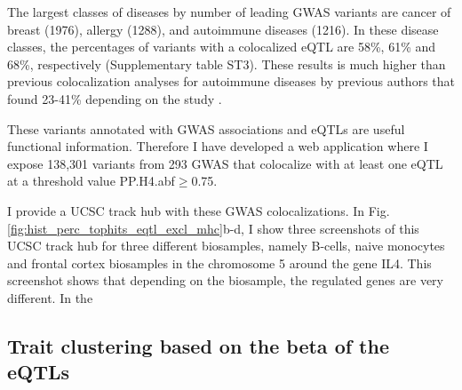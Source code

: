 The largest classes of diseases by number of leading GWAS variants are cancer of breast (1976), allergy (1288), and autoimmune diseases (1216).
%
In these disease classes, the percentages of variants with a colocalized eQTL are 58\%, 61\% and 68\%, respectively (Supplementary table ST3).
%
These results is much higher than previous colocalization analyses for autoimmune diseases by previous authors that
found 23-41\% depending on the study \cite{2016.Soranzo.Chen,2017.Cotsapas.Chun,2021.Li.Mu}.

These variants annotated with GWAS associations and eQTLs are useful functional information.
%
Therefore I have developed a web application where I expose 138,301 variants from 293 GWAS that colocalize with at least
one eQTL at a threshold value PP.H4.abf$\geq$0.75.

I provide a UCSC track hub with these GWAS colocalizations.
%
In Fig. \ref{fig:hist_perc_tophits_eqtl_excl_mhc}b-d, I show three screenshots of this UCSC track hub for three different biosamples, namely B-cells, naive monocytes and frontal cortex biosamples in the chromosome 5 around the gene IL4.
%
This screenshot shows that depending on the biosample, the regulated genes are very different.
%
In the 

%
\subsection*{Trait clustering based on the beta of the eQTLs}
%

